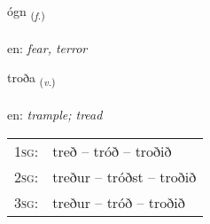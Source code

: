 \documentclass[frontgrid, backgrid]{flacards}\usepackage[]{graphicx}\usepackage[]{xcolor}
\begin{document}
\renewcommand{\flhead}{\vskip5pt \fboxsep=0pt {\small\bfseries\footnotesize Nafnorð | Noun}}
\renewcommand{\fcfoot}{\vskip5pt \fboxsep=0pt \hspace{2pt}{\small\bfseries\footnotesize 3K}}

\renewcommand{\blhead}{\vskip5pt {\small\bfseries\footnotesize Nafnorð | Noun }}
\renewcommand{\bcfoot}{\vskip5pt \hspace{2pt}{\small\bfseries\footnotesize 3K}}


{ógn \small{\textsubscript{(\textit{f.})}} \\[1ex] %
\textphonetic{[oukn̥]} \\
en: \emph{fear, terror} \\  [2ex]
\renewcommand*{\arraystretch}{0.8}
}

\renewcommand{\flhead}{\vskip5pt \fboxsep=0pt {\small\bfseries\footnotesize Sagnorð | Verb}}
\renewcommand{\fcfoot}{\vskip5pt \fboxsep=0pt \hspace{2pt}{\small\bfseries\footnotesize 3K}}

\renewcommand{\blhead}{\vskip5pt {\small\bfseries\footnotesize Sagnorð | Verb }}
\renewcommand{\bcfoot}{\vskip5pt \hspace{2pt}{\small\bfseries\footnotesize 3K}}


{troða \small{\textsubscript{(\textit{v.})}} \\[1ex] %
\textphonetic{[tʰrɔːða]} \\
en: \emph{trample; tread} \\  [2ex]
\renewcommand*{\arraystretch}{0.8}
\begin{tabular}{p{1cm}l}
\textsc{1sg}: & treð -- tróð -- troðið \\ 
\textsc{2sg}: & treður -- tróðst -- troðið \\ 
\textsc{3sg}: & treður -- tróð -- troðið \\ 
\end{tabular}
}
\end{document}
